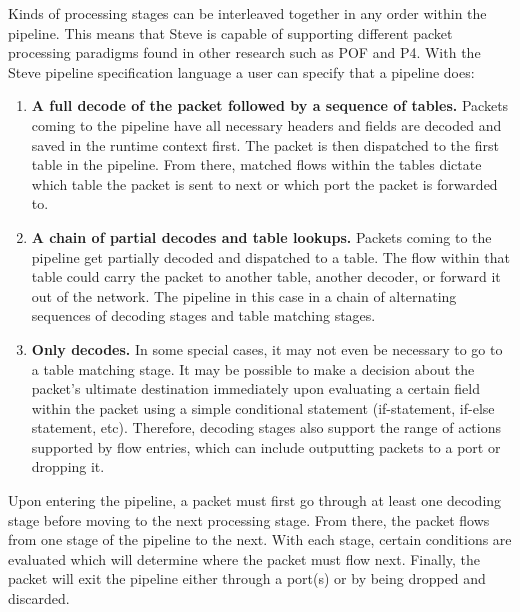 Kinds of processing stages can be interleaved together in any order within the pipeline. This means that Steve is capable of supporting different packet processing paradigms found in other research such as POF and P4. With the Steve pipeline specification language a user can specify that a pipeline does:

\begin{enumerate}
\item \textbf{A full decode of the packet followed by a sequence of tables.} Packets coming to the pipeline have all necessary headers and fields are decoded and saved in the runtime context first. The packet is then dispatched to the first table in the pipeline. From there, matched flows within the tables dictate which table the packet is sent to next or which port the packet is forwarded to.
\item \textbf{A chain of partial decodes and table lookups.} Packets coming to the pipeline get partially decoded and dispatched to a table. The flow within that table could carry the packet to another table, another decoder, or forward it out of the network. The pipeline in this case in a chain of alternating sequences of decoding stages and table matching stages.
\item \textbf{Only decodes.} In some special cases, it may not even be necessary to go to a table matching stage. It may be possible to make a decision about the packet’s ultimate destination immediately upon evaluating a certain field within the packet using a simple conditional statement (if-statement, if-else statement, etc). Therefore, decoding stages also support the range of actions supported by flow entries, which can include outputting packets to a port or dropping it.
\end{enumerate}

Upon entering the pipeline, a packet must first go through at least one decoding stage before moving to the next processing stage. From there, the packet flows from one stage of the pipeline to the next. With each stage, certain conditions are evaluated which will determine where the packet must flow next. Finally, the packet will exit the pipeline either through a port(s) or by being dropped and discarded.
